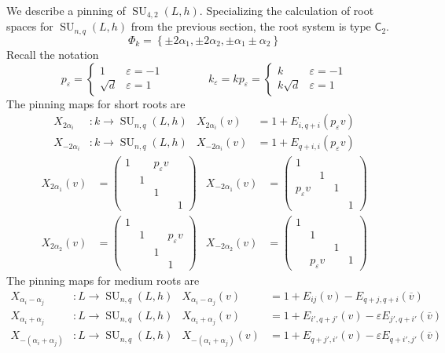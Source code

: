 \documentclass[12pt]{article}
\theoremstyle{definition}
\numberwithin{theorem}{subsection}
\newcommand{\eps}{\varepsilon}
\newcommand{\lb}{\left\{}
\newcommand{\rb}{\right\}}
\newcommand{\ov}{\overline}
\DeclareMathOperator{\SU}{SU}
\begin{document}
We describe a pinning of $\SU_{4,2}(L,h)$. Specializing the calculation of root spaces for $\SU_{n,q}(L,h)$ from the previous section, the root system is type $\mathsf{C}_2$.
\[
	\Phi_k = \lb \pm 2\alpha_1, \pm 2 \alpha_2, \pm \alpha_1 \pm \alpha_2 \rb
\]
Recall the notation
\[
	p_\eps =
	\begin{cases}
		1 & \eps = -1 \\
		\sqrt{d} & \eps = 1
	\end{cases}
	\qquad \qquad
	k_\eps = k p_\eps = 
	\begin{cases}
		k & \eps = -1 \\
		k \sqrt{d} & \eps = 1
	\end{cases} 
\]
The pinning maps for short roots are 
\begin{align*}
	X_{2\alpha_i}&: k \to \SU_{n,q}(L,h) & X_{2\alpha_i}(v) &=  1 + E_{i,q+i}(p_\eps v) \\
	X_{-2\alpha_i}&: k \to \SU_{n,q}(L,h) & X_{-2\alpha_i}(v) &= 1 + E_{q+i,i}(p_\eps v)
\end{align*}
\begin{align*}
	X_{2\alpha_1}(v) &=
	\begin{pmatrix}
		1 && p_\eps v \\
		& 1 \\
		&& 1 \\
		&&& 1
	\end{pmatrix} &
	X_{-2\alpha_1}(v) &=
	\begin{pmatrix}
		1 \\
		& 1 \\
		p_\eps v && 1 \\
		&&& 1
	\end{pmatrix} \\[2ex]
	X_{2\alpha_2}(v) &=
	\begin{pmatrix}
		1 \\
		& 1 && p_\eps v \\
		&& 1 \\
		&&& 1
	\end{pmatrix} &
	X_{-2\alpha_2}(v) &=
	\begin{pmatrix}
		1 \\
		& 1 \\
		&& 1 \\
		& p_\eps v && 1
	\end{pmatrix}
\end{align*}
The pinning maps for medium roots are
\begin{align*}
	X_{\alpha_i - \alpha_j}&:L \to \SU_{n,q}(L,h) & X_{\alpha_i - \alpha_j}(v) &= 1 + E_{ij}(v) - E_{q+j,q+i}(\ov v) \\
	X_{\alpha_i + \alpha_j}&:L \to \SU_{n,q}(L,h) & X_{\alpha_i + \alpha_j}(v) &= 1 + E_{i',q+j'}(v) - \eps E_{j',q+i'}(\ov v) \\
	X_{-(\alpha_i + \alpha_j)}&:L \to \SU_{n,q}(L,h) & X_{-(\alpha_i + \alpha_j)}(v) &= 1 + E_{q+j',i'}(v) - \eps E_{q+i',j'}( \ov v)
\end{align*}
\end{document}
